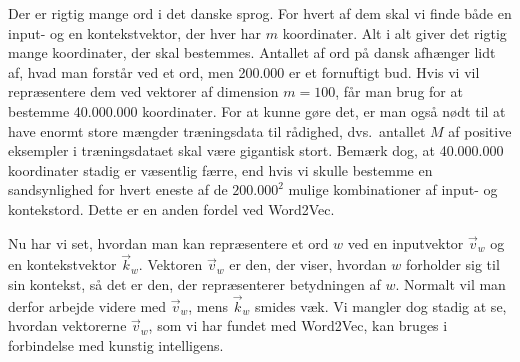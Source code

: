 \documentclass{article}
\newcommand{\am}[1]{{\color{red} #1}}
\begin{document}


Der er rigtig mange ord i det danske sprog. For hvert af dem skal vi finde både en input- og en kontekstvektor, der hver har $m$ koordinater.  Alt i alt giver det rigtig mange koordinater, der skal bestemmes. Antallet af ord på dansk afhænger lidt af, hvad man forstår ved et ord, men 200.000 er et fornuftigt bud. Hvis vi vil repræsentere dem ved vektorer af dimension $m=100$, får man brug for at bestemme 40.000.000 koordinater. For at kunne gøre det, er man også nødt til at have enormt store mængder træningsdata til rådighed, dvs.\ antallet $M$ af positive eksempler i træningsdataet skal være gigantisk stort. Bemærk dog, at 40.000.000 koordinater stadig er væsentlig færre, end hvis vi skulle bestemme en sandsynlighed for hvert eneste af de $200.000^2$ mulige kombinationer af input- og kontekstord. Dette er en anden fordel ved Word2Vec.

Nu har vi set, hvordan man kan repræsentere et ord $w$ ved en inputvektor $\overrightarrow{v}_{w}$ og en kontekstvektor $\overrightarrow{k}_{w}$. Vektoren $\overrightarrow{v}_{w} $ er den, der viser, hvordan $w$ forholder sig til sin kontekst, så det er den, der repræsenterer betydningen af $w$. Normalt vil man derfor arbejde videre med $\overrightarrow{v}_{w}$, mens $\overrightarrow{k}_{w}$ smides væk. Vi mangler dog stadig at se, hvordan vektorerne $\overrightarrow{v}_{w}$, som vi har fundet med Word2Vec, kan bruges i forbindelse med kunstig intelligens. 
\end{document}
